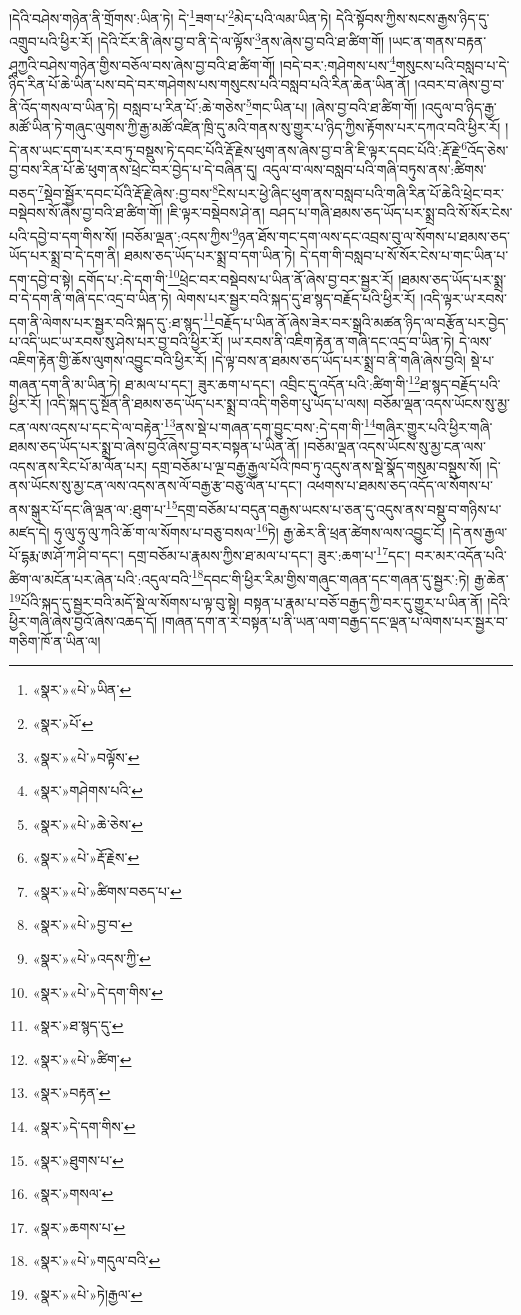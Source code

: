 །དེའི་བཤེས་གཉེན་ནི་གྲོགས་:ཡིན་ཏེ། དེ་\footnote{«སྣར་»«པེ་»ཡིན་}ཟག་པ་\footnote{«སྣར་»པོ་}མེད་པའི་ལམ་ཡིན་ཏེ། དེའི་སྟོབས་ཀྱིས་སངས་རྒྱས་ཉིད་དུ་འགྲུབ་པའི་ཕྱིར་རོ། །དེའི་ངོར་ནི་ཞེས་བྱ་བ་ནི་དེ་ལ་ལྟོས་\footnote{«སྣར་»«པེ་»བལྟོས་}ནས་ཞེས་བྱ་བའི་ཐ་ཚིག་གོ། །ཡང་ན་གནས་བརྟན་ཤཱཀྱའི་བཤེས་གཉེན་གྱིས་བཅོལ་བས་ཞེས་བྱ་བའི་ཐ་ཚིག་གོ། །བདེ་བར་:གཤེགས་པས་\footnote{«སྣར་»གཤེགས་པའི་}གསུངས་པའི་བསླབ་པ་དེ་ཉིད་རིན་པོ་ཆེ་ཡིན་པས་བདེ་བར་གཤེགས་པས་གསུངས་པའི་བསླབ་པའི་རིན་ཆེན་ཡིན་ནོ། །འབར་བ་ཞེས་བྱ་བ་ནི་འོད་གསལ་བ་ཡིན་ཏེ། བསླབ་པ་རིན་པོ་:ཆེ་གཅེས་\footnote{«སྣར་»«པེ་»ཆེ་ཅེས་}གང་ཡིན་པ། །ཞེས་བྱ་བའི་ཐ་ཚིག་གོ། །འདུལ་བ་ཉིད་རྒྱ་མཚོ་ཡིན་ཏེ་གཞུང་ལུགས་ཀྱི་རྒྱ་མཚོ་འཛིན་ཁྲི་དུ་མའི་གནས་སུ་གྱུར་པ་ཉིད་ཀྱིས་རྟོགས་པར་དཀའ་བའི་ཕྱིར་རོ། །དེ་ནས་ཡང་དག་པར་རབ་ཏུ་བསྡུས་ཏེ་དབང་པོའི་རྡོ་རྗེས་ཕུག་ནས་ཞེས་བྱ་བ་ནི་ཇི་ལྟར་དབང་པོའི་:རྡོ་རྗེ་\footnote{«སྣར་»«པེ་»རྡོ་རྗེས་}འོད་ཅེས་བྱ་བས་རིན་པོ་ཆེ་ཕུག་ནས་ཕྲེང་བར་བྱེད་པ་དེ་བཞིན་དུ། འདུལ་བ་ལས་བསླབ་པའི་གཞི་བཏུས་ནས་:ཚིགས་བཅད་\footnote{«སྣར་»«པེ་»ཚིགས་བཅད་པ་}སྡེབ་སྦྱོར་དབང་པོའི་རྡོ་རྗེ་ཞེས་:བྱ་བས་\footnote{«སྣར་»«པེ་»བྱ་བ་}ངེས་པར་ཕྱེ་ཞིང་ཕུག་ནས་བསླབ་པའི་གཞི་རིན་པོ་ཆེའི་ཕྲེང་བར་བསྡེབས་སོ་ཞེས་བྱ་བའི་ཐ་ཚིག་གོ། །ཇི་ལྟར་བསྡེབས་ཤེ་ན། བཤད་པ་གཞི་ཐམས་ཅད་ཡོད་པར་སྨྲ་བའི་སོ་སོར་ངེས་པའི་དབྱེ་བ་དག་གིས་སོ། །བཅོམ་ལྡན་:འདས་ཀྱིས་\footnote{«སྣར་»«པེ་»འདས་ཀྱི་}ཉན་ཐོས་གང་དག་ལས་དང་འབྲས་བུ་ལ་སོགས་པ་ཐམས་ཅད་ཡོད་པར་སྨྲ་བ་དེ་དག་ནི། ཐམས་ཅད་ཡོད་པར་སྨྲ་བ་དག་ཡིན་ཏེ། དེ་དག་གི་བསླབ་པ་སོ་སོར་ངེས་པ་གང་ཡིན་པ་དག་དབྱེ་བ་སྟེ། དགོད་པ་:དེ་དག་གི་\footnote{«སྣར་»«པེ་»དེ་དག་གིས་}ཕྲེང་བར་བསྡེབས་པ་ཡིན་ནོ་ཞེས་བྱ་བར་སྦྱར་རོ། །ཐམས་ཅད་ཡོད་པར་སྨྲ་བ་དེ་དག་ནི་གཞི་དང་འདྲ་བ་ཡིན་ཏེ། ལེགས་པར་སྦྱར་བའི་སྐད་དུ་ཐ་སྙད་བརྗོད་པའི་ཕྱིར་རོ། །འདི་ལྟར་ཡ་རབས་དག་ནི་ལེགས་པར་སྦྱར་བའི་སྐད་དུ་:ཐ་སྙད་\footnote{«སྣར་»ཐ་སྙད་དུ་}བརྗོད་པ་ཡིན་ནོ་ཞེས་ཟེར་བར་སྒྲའི་མཚན་ཉིད་ལ་བརྩོན་པར་བྱེད་པ་འདི་ཡང་ཡ་རབས་སུ་ཤེས་པར་བྱ་བའི་ཕྱིར་རོ། །ཡ་རབས་ནི་འཇིག་རྟེན་ན་གཞི་དང་འདྲ་བ་ཡིན་ཏེ། དེ་ལས་འཇིག་རྟེན་གྱི་ཆོས་ལུགས་འབྱུང་བའི་ཕྱིར་རོ། །དེ་ལྟ་བས་ན་ཐམས་ཅད་ཡོད་པར་སྨྲ་བ་ནི་གཞི་ཞེས་བྱའི། སྡེ་པ་གཞན་དག་ནི་མ་ཡིན་ཏེ། ཐ་མལ་པ་དང་། ཟུར་ཆག་པ་དང་། འབྲིང་དུ་འདོན་པའི་:ཚིག་གི་\footnote{«སྣར་»«པེ་»ཚིག་}ཐ་སྙད་བརྗོད་པའི་ཕྱིར་རོ། །འདི་སྐད་དུ་སྔོན་ནི་ཐམས་ཅད་ཡོད་པར་སྨྲ་བ་འདི་གཅིག་པུ་ཡོད་པ་ལས། བཅོམ་ལྡན་འདས་ཡོངས་སུ་མྱ་ངན་ལས་འདས་པ་དང་དེ་ལ་བརྟེན་\footnote{«སྣར་»བརྟན་}ནས་སྡེ་པ་གཞན་དག་བྱུང་བས་:དེ་དག་གི་\footnote{«སྣར་»དེ་དག་གིས་}གཞིར་གྱུར་པའི་ཕྱིར་གཞི་ཐམས་ཅད་ཡོད་པར་སྨྲ་བ་ཞེས་བྱའོ་ཞེས་བྱ་བར་བསྟན་པ་ཡིན་ནོ། །བཅོམ་ལྡན་འདས་ཡོངས་སུ་མྱ་ངན་ལས་འདས་ནས་རིང་པོ་མ་ལོན་པར། དགྲ་བཅོམ་པ་ལྔ་བརྒྱ་རྒྱལ་པོའི་ཁབ་ཏུ་འདུས་ནས་སྡེ་སྣོད་གསུམ་བསྡུས་སོ། །དེ་ནས་ཡོངས་སུ་མྱ་ངན་ལས་འདས་ནས་ལོ་བརྒྱ་རྩ་བཅུ་ལོན་པ་དང་། འཕགས་པ་ཐམས་ཅད་འདོད་ལ་སོགས་པ་ནས་སྒུར་པོ་དང་ཞི་ལྡན་ལ་:ཐུག་པ་\footnote{«སྣར་»ཐུགས་པ་}དགྲ་བཅོམ་པ་བདུན་བརྒྱས་ཡངས་པ་ཅན་དུ་འདུས་ནས་བསྡུ་བ་གཉིས་པ་མཛད་དེ། ཧུ་ལུ་ཧུ་ལུ་ཀའི་ཆོ་ག་ལ་སོགས་པ་བཅུ་བསལ་\footnote{«སྣར་»གསལ་}ཏེ། རྒྱ་ཆེར་ནི་ཕྲན་ཚེགས་ལས་འབྱུང་ངོ། །དེ་ནས་རྒྱལ་པོ་དྷརྨ་ཨ་ཤོ་ཀ་ཤི་བ་དང་། དགྲ་བཅོམ་པ་རྣམས་ཀྱིས་ཐ་མལ་པ་དང་། ཟུར་:ཆག་པ་\footnote{«སྣར་»ཆགས་པ་}དང་། བར་མར་འདོན་པའི་ཚིག་ལ་མངོན་པར་ཞེན་པའི་:འདུལ་བའི་\footnote{«སྣར་»«པེ་»གདུལ་བའི་}དབང་གི་ཕྱིར་རིམ་གྱིས་གཞུང་གཞན་དང་གཞན་དུ་སྦྱར་:ཏེ། རྒྱ་ཆེན་\footnote{«སྣར་»«པེ་»ཏེ།རྒྱལ་}པོའི་སྐད་དུ་སྦྱར་བའི་མདོ་སྡེ་ལ་སོགས་པ་ལྟ་བུ་སྟེ། བསྟན་པ་རྣམ་པ་བཅོ་བརྒྱད་ཀྱི་བར་དུ་གྱུར་པ་ཡིན་ནོ། །དེའི་ཕྱིར་གཞི་ཞེས་བྱའོ་ཞེས་འཆད་དོ། །གཞན་དག་ན་རེ་བསྟན་པ་ནི་ཡན་ལག་བརྒྱད་དང་ལྡན་པ་ལེགས་པར་སྦྱར་བ་གཅིག་ཁོ་ན་ཡིན་ལ། 